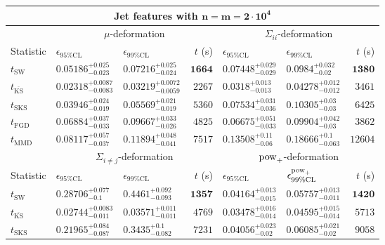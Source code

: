 \begin{tabular}{l|llr|llr}
	\toprule
	\multicolumn{7}{c}{{\bf Jet features with $\mathbf{n=m=2\cdot 10^{4}}$}} \\
	\toprule
	\multicolumn{1}{c}{} & \multicolumn{3}{c}{$\mu$-deformation} & \multicolumn{3}{c}{$\Sigma_{ii}$-deformation} \\
	Statistic & $\epsilon_{95\%\mathrm{CL}}$ & $\epsilon_{99\%\mathrm    {CL}}$ & $t$ (s) & $\epsilon_{95\%\mathrm{CL}}$ & $\epsilon_{99\%\mathrm{CL}}$ & $t$ (s) \\
	\midrule
	$t_{\mathrm{SW}}$ & $0.05186_{-0.023}^{+0.025}$ & $0.07216_{-0.024}^{+0.025}$ & ${\mathbf{1664}}$ & $0.07448_{-0.029}^{+0.029}$ & $0.0984_{-0.02}^{+0.032}$ & ${\mathbf{1380}}$ \\
	$t_{\overline{\mathrm{KS}}}$ & ${\mathbf{0.02318_{-0.0083}^{+0.0087}}}$ & ${\mathbf{0.03219_{-0.0059}^{+0.0072}}}$ & $2267$ & ${\mathbf{0.0318_{-0.013}^{+0.013}}}$ & ${\mathbf{0.04278_{-0.012}^{+0.012}}}$ & $3461$ \\
	$t_{\mathrm{SKS}}$ & $0.03946_{-0.019}^{+0.024}$ & $0.05569_{-0.019}^{+0.021}$ & $5360$ & $0.07534_{-0.036}^{+0.031}$ & $0.10305_{-0.03}^{+0.03}$ & $6425$ \\
	$t_{\mathrm{FGD}}$ & $0.06884_{-0.033}^{+0.037}$ & $0.09667_{-0.026}^{+0.033}$ & $4825$ & $0.06675_{-0.033}^{+0.051}$ & $0.09904_{-0.03}^{+0.042}$ & $3862$ \\
	$t_{\mathrm{MMD}}$ & $0.08117_{-0.037}^{+0.057}$ & $0.11894_{-0.041}^{+0.048}$ & $7517$ & $0.13508_{-0.06}^{+0.11}$ & $0.18666_{-0.063}^{+0.1}$ & $12604$ \\
	\toprule
	\multicolumn{1}{c}{} & \multicolumn{3}{c}{$\Sigma_{i\neq j}$-deformation} & \multicolumn{3}{c}{$\rm{pow}_{+}$-deformation} \\
	Statistic & $\epsilon_{95\%\mathrm{CL}}$ & $\epsilon_{99\%\mathrm{CL}}$ & $t$ (s) & $\epsilon_{95\%\mathrm{CL}}$ & $\epsilon^{\rm   {pow}_{+}}_{99\%\mathrm{CL}}$ & $t$ (s) \\
	\midrule
	$t_{\mathrm{SW}}$ & $0.28706_{-0.1}^{+0.077}$ & $0.4461_{-0.093}^{+0.092}$ & ${\mathbf{1357}}$ & $0.04164_{-0.015}^{+0.013}$ & $0.05757_{-0.011}^{+0.013}$ & ${\mathbf{1420}}$ \\
	$t_{\overline{\mathrm{KS}}}$ & ${\mathbf{0.02744_{-0.011}^{+0.0083}}}$ & ${\mathbf{0.03571_{-0.011}^{+0.011}}}$ & $4769$ & $0.03478_{-0.014}^{+0.016}$ & ${\mathbf{0.04595_{-0.014}^{+0.015}}}$ & $5713$ \\
	$t_{\mathrm{SKS}}$ & $0.21965_{-0.087}^{+0.084}$ & $0.3435_{-0.082}^{+0.1}$ & $7231$ & $0.04056_{-0.02}^{+0.023}$ & $0.06085_{-0.02}^{+0.021}$ & $9058$ \\

\end{tabular}

